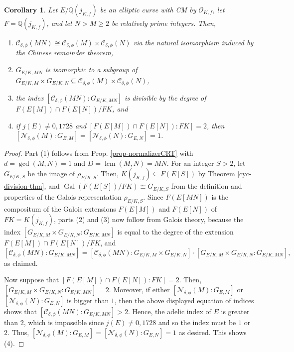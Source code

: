\documentclass[11pt]{amsart}
\newtheorem{corollary}[defn]{Corollary}
\theoremstyle{definition}
\newcommand{\Q}{\mathbb{Q}}
\newcommand{\Of}{\mathcal{O}_{K,f}}
\newcommand{\Gal}{\operatorname{Gal}}
\newcommand{\lcm}{\operatorname{lcm}}
\begin{document}
\begin{corollary}\label{cor-galoistheoryofcompositum}
    Let $E/\Q(j_{K,f})$ be an elliptic curve with CM by $\Of$, let $F=\Q(j_{K,f})$, and let $N>M\geq 2$ be relatively prime integers. Then,
    \begin{enumerate}
        \item $\mathcal{C}_{\delta, \phi}(MN)\cong \mathcal{C}_{\delta, \phi}(M)\times \mathcal{C}_{\delta, \phi}(N)$ via the natural isomorphism induced by the Chinese remainder theorem,
        \item $G_{E/K,MN}$ is isomorphic to a subgroup  of $ G_{E/K,M}\times G_{E/K,N} \subseteq \mathcal{C}_{\delta, \phi}(M)\times \mathcal{C}_{\delta, \phi}(N)$, 
        \item the index $[\mathcal{C}_{\delta, \phi}(MN): G_{E/K,MN}]$ is divisible by the degree of $F(E[M])\cap F(E[N])/FK$, and
        \item if $j(E)\neq 0,1728$ and $[F(E[M])\cap F(E[N]):FK]=2$, then $[\mathcal{N}_{\delta, \phi}(M):G_{E,M}]=[\mathcal{N}_{\delta, \phi}(N):G_{E,N}]=1$.
    \end{enumerate}
\end{corollary}
\begin{proof}
    Part (1) follows from Prop. \ref{prop-normalizerCRT} with $d=\gcd(M,N)=1$ and $D=\lcm(M,N)=MN$. For an integer $S>2$, let $G_{E/K,S}$ be the image of $\rho_{E/K,S}$. Then, $K(j_{K,f})\subseteq F(E[S])$ by Theorem \ref{cyc-division-thm}, and $\Gal(F(E[S])/FK) \cong G_{E/K,S}$ from the definition and properties of the Galois representation $\rho_{E/K,S}$. Since $F(E[MN])$ is the compositum of the Galois extensions $F(E[M])$ and $F(E[N])$ of $FK=K(j_{K,f})$, parts (2) and (3) now follow from Galois theory, because the index $[G_{E/K,M}\times G_{E/K,N}:G_{E/K,MN}]$ is equal to the degree of the extension $F(E[M])\cap F(E[N])/FK$, and
    $$[\mathcal{C}_{\delta, \phi}(MN): G_{E/K,MN}] = [\mathcal{C}_{\delta, \phi}(MN):G_{E/K,M}\times G_{E/K,N}]\cdot [G_{E/K,M}\times G_{E/K,N}:G_{E/K,MN}],$$
    as claimed.

    Now suppose that $[F(E[M])\cap F(E[N]):FK]=2$. Then, $[G_{E/K,M}\times G_{E/K,N}:G_{E/K,MN}]=2$. Moreover, if either $[\mathcal{N}_{\delta, \phi}(M):G_{E,M}]$ or $[\mathcal{N}_{\delta, \phi}(N):G_{E,N}]$ is bigger than $1$, then the above displayed equation of indices shows that $[\mathcal{C}_{\delta, \phi}(MN): G_{E/K,MN}]>2$. Hence, the adelic index of $E$ is greater than $2$, which is impossible since $j(E)\neq 0,1728$ and so the index must be $1$ or $2$. Thus, $[\mathcal{N}_{\delta, \phi}(M):G_{E,M}]=[\mathcal{N}_{\delta, \phi}(N):G_{E,N}]=1$ as desired. This shows (4).
\end{proof}
\end{document}
